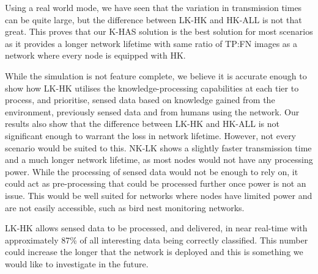 Using a real world mode, we have seen that the variation in transmission times can be quite large, but the difference between LK-HK and HK-ALL is not that great. This proves that our K-HAS solution  is the best solution for most scenarios as it provides a longer network lifetime with same ratio of TP:FN images as a network where every node is equipped with HK.

While the simulation is not feature complete, we believe it is accurate enough to show how LK-HK utilises the knowledge-processing capabilities at each tier to process, and prioritise, sensed data based on knowledge gained from the environment, previously sensed data and from humans using the network. Our results also show that the difference between LK-HK and HK-ALL is  not significant enough to warrant the loss in network lifetime. However, not every scenario would be suited to this. NK-LK shows a slightly faster transmission time and a much longer network lifetime, as most nodes would not have any processing power. While the processing of sensed data would not be enough to rely on, it could act as pre-processing that could be processed further once power is not an issue. This would be well suited for networks where nodes have limited power and are not easily accessible, such as bird nest monitoring networks. 

LK-HK allows sensed data to be processed, and delivered, in near real-time with approximately 87\% of all interesting data being correctly classified. This number could increase the longer that the network is deployed and this is something we would like to investigate in the future.







































